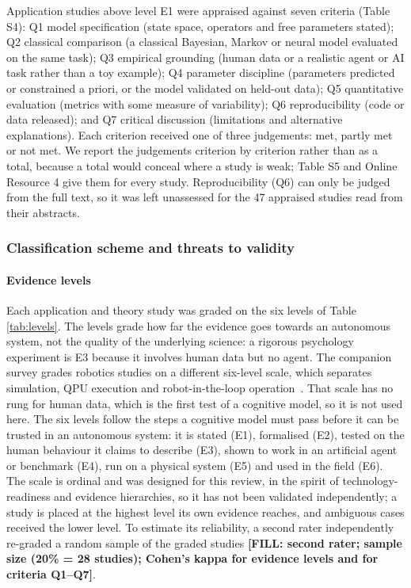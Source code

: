 \documentclass[pdflatex,sn-basic]{sn-jnl}
\newcommand{\fillin}[1]{{\color{red}\bfseries [FILL: #1]}}
\begin{document}
Application studies above level E1 were appraised against seven criteria (Table S4): Q1 model specification (state space, operators and free parameters stated); Q2 classical comparison (a classical Bayesian, Markov or neural model evaluated on the same task); Q3 empirical grounding (human data or a realistic agent or AI task rather than a toy example); Q4 parameter discipline (parameters predicted or constrained a priori, or the model validated on held-out data); Q5 quantitative evaluation (metrics with some measure of variability); Q6 reproducibility (code or data released); and Q7 critical discussion (limitations and alternative explanations). Each criterion received one of three judgements: met, partly met or not met. We report the judgements criterion by criterion rather than as a total, because a total would conceal where a study is weak; Table S5 and Online Resource 4 give them for every study. Reproducibility (Q6) can only be judged from the full text, so it was left unassessed for the 47 appraised studies read from their abstracts.

\subsubsection{Classification scheme and threats to validity}\label{sec:classification}
\paragraph{Evidence levels} Each application and theory study was graded on the six levels of Table \ref{tab:levels}. The levels grade how far the evidence goes towards an autonomous system, not the quality of the underlying science: a rigorous psychology experiment is E3 because it involves human data but no agent. The companion survey grades robotics studies on a different six-level scale, which separates simulation, QPU execution and robot-in-the-loop operation~\citep{Guru2026}. That scale has no rung for human data, which is the first test of a cognitive model, so it is not used here. The six levels follow the steps a cognitive model must pass before it can be trusted in an autonomous system: it is stated (E1), formalised (E2), tested on the human behaviour it claims to describe (E3), shown to work in an artificial agent or benchmark (E4), run on a physical system (E5) and used in the field (E6). The scale is ordinal and was designed for this review, in the spirit of technology-readiness and evidence hierarchies, so it has not been validated independently; a study is placed at the highest level its own evidence reaches, and ambiguous cases received the lower level. To estimate its reliability, a second rater independently re-graded a random sample of the graded studies \fillin{second rater; sample size (20\% = 28 studies); Cohen's kappa for evidence levels and for criteria Q1--Q7}.
\end{document}
